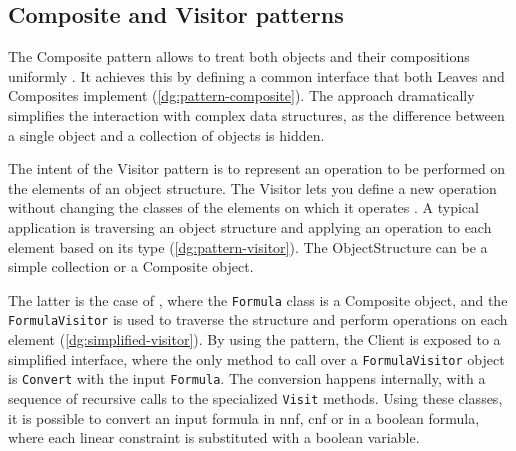 
\subsection*{Composite and Visitor patterns}

The Composite pattern allows to treat both objects and their compositions uniformly \cite{book:gof}.
It achieves this by defining a common interface that both Leaves and Composites implement (\autoref{dg:pattern-composite}).
The approach dramatically simplifies the interaction with complex data structures, as the difference between a single object and a collection of objects is hidden.


The intent of the Visitor pattern is to represent an operation to be performed on the elements of an object structure.
The Visitor lets you define a new operation without changing the classes of the elements on which it operates \cite{book:gof}.
A typical application is traversing an object structure and applying an operation to each element based on its type (\autoref{dg:pattern-visitor}).
The ObjectStructure can be a simple collection or a Composite object.


The latter is the case of \dlinear, where the \texttt{Formula} class is a Composite object, and the \texttt{FormulaVisitor} is used to traverse the structure and perform operations on each element (\autoref{dg:simplified-visitor}).
By using the pattern, the Client is exposed to a simplified interface, where the only method to call over a \texttt{FormulaVisitor} object is \texttt{Convert} with the input \texttt{Formula}.
The conversion happens internally, with a sequence of recursive calls to the specialized \texttt{Visit} methods.
Using these classes, it is possible to convert an input formula in \gls{nnf}, \gls{cnf} or in a boolean formula, where each linear constraint is substituted with a boolean variable.


